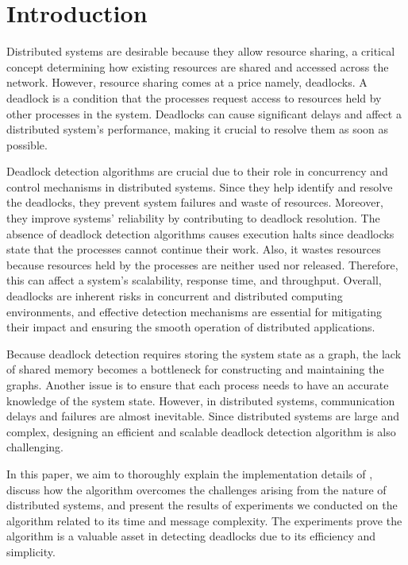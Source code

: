 \documentclass[letterpaper,10pt,english]{sphinxmanual}
\begin{document}
\section{Introduction}
\label{\detokenize{docs/BrachaToueg/introduction:introduction}}\label{\detokenize{docs/BrachaToueg/introduction::doc}}
\sphinxAtStartPar
Distributed systems are desirable because they allow resource sharing, a critical concept determining how existing resources are shared and accessed across the network. However, resource sharing comes at a price \sphinxhyphen{} namely, deadlocks. A deadlock is a condition that the processes request access to resources held by other processes in the system. Deadlocks can cause significant delays and affect a distributed system’s performance, making it crucial to resolve them as soon as possible.

\sphinxAtStartPar
Deadlock detection algorithms are crucial due to their role in concurrency and control mechanisms in distributed systems. Since they help identify and resolve the deadlocks, they prevent system failures and waste of resources. Moreover, they improve systems’ reliability by contributing to deadlock resolution. The absence of deadlock detection algorithms causes execution halts since deadlocks state that the processes cannot continue their work. Also, it wastes resources because resources held by the processes are neither used nor released. Therefore, this can affect a system’s scalability, response time, and throughput. Overall, deadlocks are inherent risks in concurrent and distributed computing environments, and effective detection mechanisms are essential for mitigating their impact and ensuring the smooth operation of distributed applications.

\sphinxAtStartPar
Because deadlock detection requires storing the system state as a graph, the lack of shared memory becomes a bottleneck for constructing and maintaining the graphs. Another issue is to ensure that each process needs to have an accurate knowledge of the system state. However, in distributed systems, communication delays and failures are almost inevitable. Since distributed systems are large and complex, designing an efficient and scalable deadlock detection algorithm is also challenging.

\sphinxAtStartPar
In this paper, we aim to thoroughly explain the implementation details of {\hyperref[\detokenize{docs/BrachaToueg/algorithm:brachatouegdeadlockdetectionalgorithm}]{}}, discuss how the algorithm overcomes the challenges arising from the nature of distributed systems, and present the results of experiments we conducted on the algorithm related to its time and message complexity. The experiments prove the algorithm is a valuable asset in detecting deadlocks due to its efficiency and simplicity.
\end{document}
